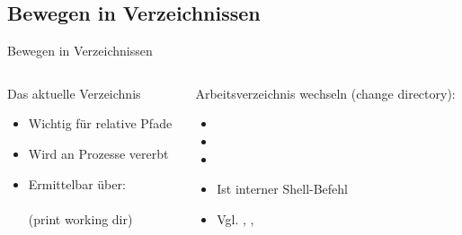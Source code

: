 \documentclass[aspectratio=43]{beamer}
\begin{document}
\subsection{Bewegen in Verzeichnissen}
\begin{frame}{Bewegen in Verzeichnissen}
  \begin{columns}
    \begin{column}{0.5\textwidth}
      \begin{block}{Das aktuelle Verzeichnis}
        \begin{itemize}
          \item Wichtig für relative Pfade
          \item Wird an Prozesse vererbt
          \item Ermittelbar über: \\  \\(print working dir)
        \end{itemize}
      \end{block}
    \end{column}
    \begin{column}{0.5\textwidth}
       \begin{block}{Arbeitsverzeichnis wechseln}
             (change directory):
            \begin{itemize}
              \item {}
              \item {}
              \item {}
              \item Ist interner Shell-Befehl
              \item Vgl. , ,
            \end{itemize}
        \end{block}
    \end{column}
  \end{columns}
\end{frame}
\end{document}
